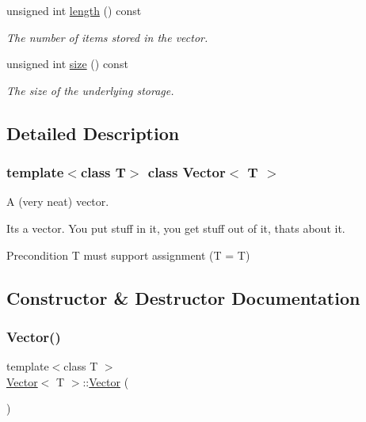 \begin{DoxyCompactItemize}
unsigned int \hyperlink{classVector_af15b2f88e9cc1f54cdb2759db37c13c2}{length} () const
\begin{DoxyCompactList}\small\item\em The number of items stored in the vector. \end{DoxyCompactList}\item 
unsigned int \hyperlink{classVector_a5214a382564aedc712b609416aa3b7b1}{size} () const
\begin{DoxyCompactList}\small\item\em The size of the underlying storage. \end{DoxyCompactList}\end{DoxyCompactItemize}


\subsection{Detailed Description}
\subsubsection*{template$<$class T$>$\newline
class Vector$<$ T $>$}

A (very neat) vector. 

It\textquotesingle{}s a vector. You put stuff in it, you get stuff out of it, that\textquotesingle{}s about it.

\begin{DoxyPrecond}{Precondition}
T must support assignment (T = T) 
\end{DoxyPrecond}


\subsection{Constructor \& Destructor Documentation}
\mbox{\label{classVector_a39d6069675db4ecfc1ab81d440da759a}} 
\subsubsection{\texorpdfstring{Vector()}{Vector()}\hspace{0.1cm}{\footnotesize\ttfamily [1/2]}}
{\footnotesize\ttfamily template$<$class T $>$ \\
\hyperlink{classVector}{Vector}$<$ T $>$\+::\hyperlink{classVector}{Vector} (\begin{DoxyParamCaption}{ }\end{DoxyParamCaption})}



